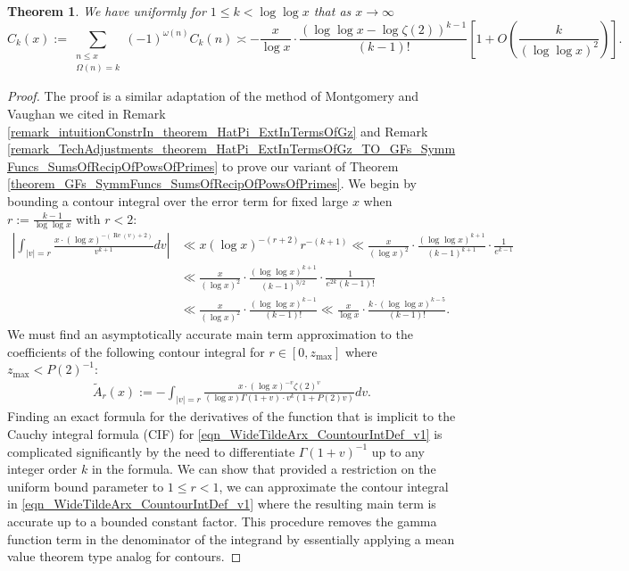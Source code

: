 \documentclass[11pt,reqno,a4letter]{article}
\numberwithin{figure}{section}
\numberwithin{table}{section}
\theoremstyle{plain}
\newtheorem{theorem}{Theorem}
\numberwithin{theorem}{section}
\theoremstyle{definition}
\renewcommand{\Re}{\operatorname{Re}}
\begin{document}
\begin{theorem} 
\label{theorem_CnkSpCasesScaledSummatoryFuncs} 
We have uniformly for $1 \leq k < \log\log x$ 
that as $x \rightarrow \infty$ 
\[
\widehat{C}_k(x) := 
     \sum_{\substack{n \leq x \\ \Omega(n) = k}} (-1)^{\omega(n)} 
     C_k(n) \asymp 
     -\frac{x}{\log x} \cdot \frac{(\log\log x - \log\zeta(2))^{k-1}}{(k-1)!} \left[1 + 
     O\left(\frac{k}{(\log\log x)^2}\right)\right]. 
\]
\end{theorem} 
\begin{proof} 
The proof is a similar adaptation of the method of Montgomery and Vaughan we cited in 
Remark \ref{remark_intuitionConstrIn_theorem_HatPi_ExtInTermsOfGz} and 
Remark \ref{remark_TechAdjustments_theorem_HatPi_ExtInTermsOfGz_TO_GFs_SymmFuncs_SumsOfRecipOfPowsOfPrimes} 
to prove our variant of 
Theorem \ref{theorem_GFs_SymmFuncs_SumsOfRecipOfPowsOfPrimes}. 
We begin by bounding a contour integral over the error term for fixed large $x$ when 
$r := \frac{k-1}{\log\log x}$ with $r < 2$: 
\begin{align*} 
\left\lvert \int_{|v|=r} \frac{x \cdot (\log x)^{-(\Re(v) + 2)}}{v^{k+1}} dv \right\rvert & \ll 
     x (\log x)^{-(r+2)} r^{-(k+1)} \ll \frac{x}{(\log x)^2} \cdot 
     \frac{(\log\log x)^{k+1}}{(k-1)^{k+1}} \cdot \frac{1}{e^{k-1}} \\ 
     & \ll \frac{x}{(\log x)^2} \cdot \frac{(\log\log x)^{k+1}}{(k-1)^{3/2}} \cdot 
     \frac{1}{e^{2k} (k-1)!} \\ 
     & \ll \frac{x}{(\log x)^2} \cdot \frac{(\log\log x)^{k-1}}{(k-1)!} \ll 
     \frac{x}{\log x} \cdot \frac{k \cdot (\log\log x)^{k-5}}{(k-1)!}. 
\end{align*} 
We must find an asymptotically accurate main term approximation to the coefficients 
of the following contour integral for $r \in [0, z_{\max}]$ where $z_{\max} < P(2)^{-1}$: 
\begin{align} 
\label{eqn_WideTildeArx_CountourIntDef_v1} 
\widetilde{A}_r(x) := 
     -\int_{|v|=r} \frac{x \cdot (\log x)^{-v} \zeta(2)^{v}}{(\log x) \Gamma(1+v) \cdot 
     v^{k} (1 + P(2) v)} dv. 
\end{align} 
Finding an exact formula for the derivatives of the function that is implicit to the 
Cauchy integral formula (CIF) for \eqref{eqn_WideTildeArx_CountourIntDef_v1} 
is complicated significantly by the need to differentiate $\Gamma(1+v)^{-1}$ 
up to any integer order $k$ in the formula. 
We can show that provided a restriction on the uniform bound parameter to 
$1 \leq r < 1$, we can approximate the contour integral in 
\eqref{eqn_WideTildeArx_CountourIntDef_v1} where 
the resulting main term is accurate up to a bounded constant factor. 
This procedure removes the 
gamma function term in the denominator of the integrand by essentially applying 
a mean value theorem type analog for contours. 


\end{proof}
\end{document}
